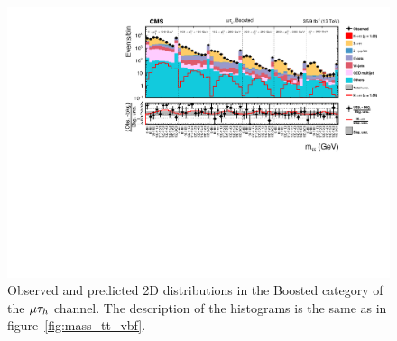 \begin{figure}[htbp]
\centering
     \includegraphics[width=1.0\textwidth]{higgs_to_taus/plots/Figure_011.pdf}
     \caption{Observed and predicted 2D distributions in the Boosted category of the $\mu\tau_{h}$ channel. The description of the histograms is the same as in figure~\ref{fig:mass_tt_vbf}.}
     \label{fig:mass_mt_boosted}
\end{figure}

%

